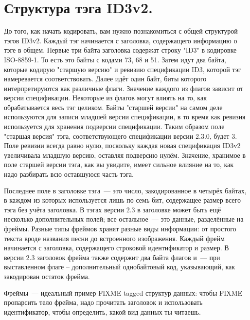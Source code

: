 \section{Структура тэга ID3v2.}

До того, как начать кодировать, вам нужно познакомиться с общей структурой тэгов
ID3v2. Каждый тэг начинается с заголовка, содержащего информацию о тэге в общем. Первые
три байта заголовка содержат строку "ID3" в кодировке ISO-8859-1. То есть это байты с
кодами 73, 68 и 51. Затем идут два байта, которые кодирую "старшую версию" и ревизию
спецификации ID3, которой тэг намеревается соответствовать. Далее идёт один байт, биты
которого интерпретируются как различные флаги. Значение каждого из флагов зависит от
версии спецификации. Некоторые из флагов могут влиять на то, как обрабатывается весь тэг
целиком.  Байты "старшей версии" на самом деле используются для записи младшей версии
спецификации, в то время как ревизия используется для хранения подверсии
спецификации. Таким образом поле "старшая версия" тэга, соответствующего спецификации
версии 2.3.0, будет 3. Поле ревизии всегда равно нулю, поскольку каждая новая спецификация
ID3v2 увеличивала младшую версию, оставляя подверсию нулём. Значение, хранимое в поле
старшей версии тэга, как вы увидите, имеет сильное влияние на то, как надо разбирать всю
оставшуюся часть тэга.

Последнее поле в заголовке тэга~--- это число, закодированное в четырёх байтах, в каждом из
которых используется лишь по семь бит, содержащее размер всего тэга без учёта заголовка.
В тэгах версии 2.3 в заголовке может быть ещё несколько дополнительных полей; все
остальное~--- это данные, разделённые на фреймы.  Разные типы фреймов хранят разные виды
информации: от простого текста вроде названия песни до встроенного изображения.  Каждый
фрейм начинается с заголовка, содержащего строковой идентификатор и размер. В версии 2.3
заголовок фрейма также содержит два байта флагов и~--- при выставленном флаге --
дополнительный однобайтовый код, указывающий, как закодирован остаток фрейма.

Фреймы~--- идеальный пример FIXME tagged структур данных: чтобы FIXME пропарсить тело
фрейма, надо прочитать заголовок и использовать идентификатор, чтобы определить, какой вид
данных ты читаешь.

